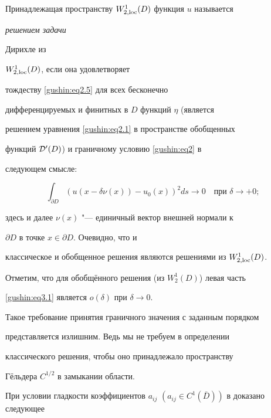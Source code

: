 \begin{definition}[3]Принадлежащая пространству $W_{2,

{\rm loc}}^1 (D)$ функция $u$  называется {\it решением задачи

Дирихле из} $W_{2, {\rm loc}}^1 (D)$, если она удовлетворяет

тождеству \eqref{gushin:eq2.5} для всех бесконечно

дифференцируемых и финитных в $D$ функций $\eta$ (является

решением уравнения \eqref{gushin:eq2.1} в пространстве обобщенных

функций ${\cal D}'(D)$) и  граничному условию \eqref{gushin:eq2} в

следующем смысле:

\begin{equation}

\label{gushin:eq3.1} \int _{\partial D} \left(u(x - \delta

\nu(x)) - u_0(x)\right)^2 ds \to 0 \quad \text{при~} \delta \to +0;

\end{equation}

здесь и далее $\nu (x)$ "--- единичный вектор внешней нормали к

$\partial D$ в точке ${x \in \partial D}$. Очевидно, что и

классическое и обобщенное решения являются решениями  из $W_{2,

{\rm loc}}^1 (D)$.

\end{definition}



\smallskip



Отметим, что для обобщённого решения (из $W_2^1(D)$) левая часть

\eqref{gushin:eq3.1} является $o(\delta)$ при $\delta \to 0$.

Такое требование принятия граничного значения с заданным порядком

представляется излишним. Ведь мы не требуем в определении

классического решения, чтобы оно принадлежало пространству

Гёльдера $C^{1/2}$ в замыкании области.



При условии гладкости коэффициентов $a_{ij}$ $( a_{ij} \in

C^1(\bar{D}))$  в \cite{gushin:M76} доказано следующее

